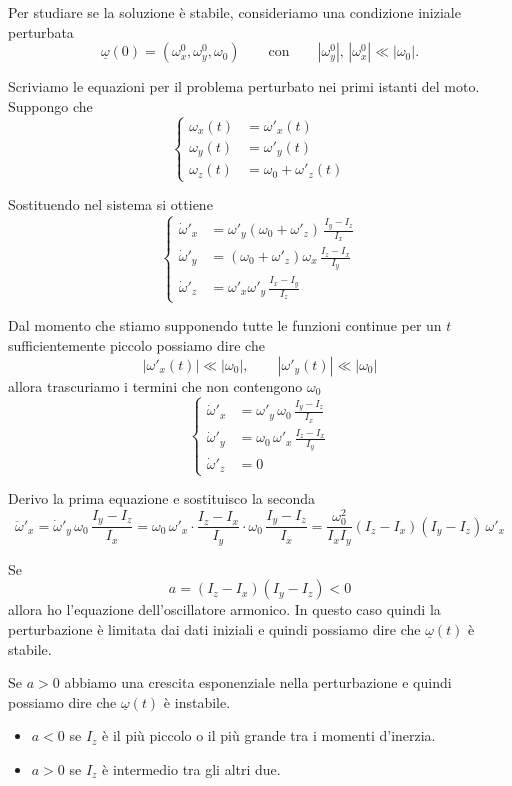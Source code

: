 Per studiare se la soluzione è stabile, consideriamo una condizione iniziale perturbata
\[
\underline{\omega}(0)=(\omega_x^0,\omega_y^0,\omega_0)
\qquad \text{con} \qquad
|\omega_y^0|,\,|\omega_x^0| \ll |\omega_0|.
\]

Scriviamo le equazioni per il problema perturbato nei primi istanti del moto. Suppongo che
\[
\left\{
\begin{aligned}
\omega_x(t) &= \omega'_x(t) \\
\omega_y(t) &= \omega'_y(t) \\
\omega_z(t) &= \omega_0 + \omega'_z(t)
\end{aligned}
\right.
\]

Sostituendo nel sistema si ottiene
\[
\left\{
\begin{aligned}
\dot{\omega}'_x &= \omega'_y(\omega_0+\omega'_z)\,\frac{I_y-I_z}{I_x} \\
\dot{\omega}'_y &= (\omega_0+\omega'_z)\omega_x\,\frac{I_z-I_x}{I_y} \\
\dot{\omega}'_z &= \omega'_x\omega'_y\,\frac{I_x-I_y}{I_z}
\end{aligned}
\right.
\]

Dal momento che stiamo supponendo tutte le funzioni continue per un $t$ sufficientemente piccolo possiamo dire che
\[
|\omega'_x(t)| \ll |\omega_0|,
\qquad
|\omega'_y(t)| \ll |\omega_0|
\]
allora trascuriamo i termini che non contengono $\omega_0$
\[
\left\{
\begin{aligned}
\dot{\omega}'_x &= \omega'_y\,\omega_0\,\frac{I_y-I_z}{I_x} \\
\dot{\omega}'_y &= \omega_0\,\omega'_x\,\frac{I_z-I_x}{I_y} \\
\dot{\omega}'_z &= 0
\end{aligned}
\right.
\]


Derivo la prima equazione e sostituisco la seconda
\[
\ddot{\omega}'_x
=
\dot{\omega}'_y\,\omega_0\,\frac{I_y-I_z}{I_x}
=
\omega_0\,\omega'_x\cdot\frac{I_z-I_x}{I_y}\cdot\omega_0\,\frac{I_y-I_z}{I_x}
=
\frac{\omega_0^2}{I_xI_y}(I_z-I_x)(I_y-I_z)\,\omega'_x
\]

Se
\[
a=(I_z-I_x)(I_y-I_z)<0
\]
allora ho l'equazione dell'oscillatore armonico. In questo caso quindi la perturbazione è limitata dai dati iniziali e quindi possiamo dire che $\underline{\omega}(t)$ è stabile.

Se $a>0$ abbiamo una crescita esponenziale nella perturbazione e quindi possiamo dire che $\underline{\omega}(t)$ è instabile.

\begin{itemize}
    \item $a<0$ se $I_z$ è il più piccolo o il più grande tra i momenti d'inerzia.
    \item $a>0$ se $I_z$ è intermedio tra gli altri due.
\end{itemize}


